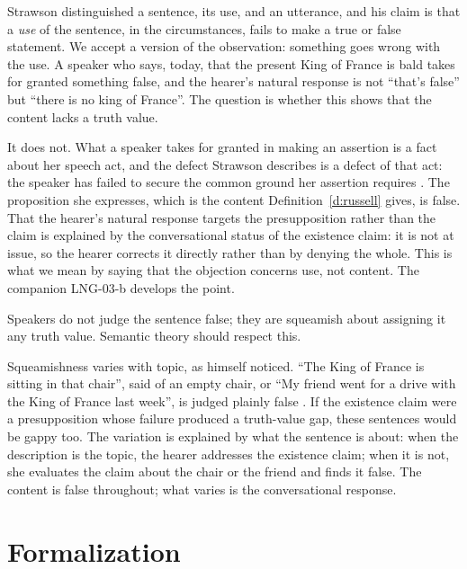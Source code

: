 \documentclass{situationist-preprint}
\begin{document}
Strawson distinguished a sentence, its use, and an utterance, and his claim is that a \emph{use} of the sentence, in the circumstances, fails to make a true or false statement. We accept a version of the observation: something goes wrong with the use. A speaker who says, today, that the present King of France is bald takes for granted something false, and the hearer's natural response is not \enquote{that's false} but \enquote{there is no king of France}. The question is whether this shows that the content lacks a truth value.

It does not. What a speaker takes for granted in making an assertion is a fact about her speech act, and the defect Strawson describes is a defect of that act: the speaker has failed to secure the common ground her assertion requires \citep{Stalnaker1974}. The proposition she expresses, which is the content Definition~\ref{d:russell} gives, is false. That the hearer's natural response targets the presupposition rather than the claim is explained by the conversational status of the existence claim: it is not at issue, so the hearer corrects it directly rather than by denying the whole. This is what we mean by saying that the objection concerns use, not content. The companion LNG-03-b develops the point.

\begin{objection}[Intuitions]
Speakers do not judge the sentence false; they are squeamish about assigning it any truth value. Semantic theory should respect this.
\end{objection}

\begin{reply}
Squeamishness varies with topic, as \citet{Strawson1964} himself noticed. \enquote{The King of France is sitting in that chair}, said of an empty chair, or \enquote{My friend went for a drive with the King of France last week}, is judged plainly false \citep{vonFintel2004}. If the existence claim were a presupposition whose failure produced a truth-value gap, these sentences would be gappy too. The variation is explained by what the sentence is about: when the description is the topic, the hearer addresses the existence claim; when it is not, she evaluates the claim about the chair or the friend and finds it false. The content is false throughout; what varies is the conversational response.
\end{reply}

\section{Formalization}
\end{document}
